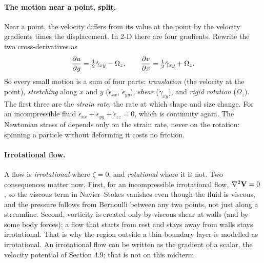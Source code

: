 \paragraph{The motion near a point, split.} Near a point, the velocity differs from its value at the point by the velocity gradients times the displacement. In 2-D there are four gradients. Rewrite the two cross-derivatives as
\[
\frac{\partial u}{\partial y} = \tfrac12\dot\gamma_{xy} - \Omega_z, \qquad \frac{\partial v}{\partial x} = \tfrac12\dot\gamma_{xy} + \Omega_z .
\]
So every small motion is a sum of four parts: \emph{translation} (the velocity at the point), \emph{stretching} along $x$ and $y$ ($\dot\epsilon_{xx}$, $\dot\epsilon_{yy}$), \emph{shear} ($\dot\gamma_{xy}$), and \emph{rigid rotation} ($\Omega_z$). The first three are the \emph{strain rate}, the rate at which shape and size change. For an incompressible fluid $\dot\epsilon_{xx} + \dot\epsilon_{yy} + \dot\epsilon_{zz} = 0$, which is continuity again. The Newtonian stress of  depends only on the strain rate, never on the rotation: spinning a particle without deforming it costs no friction.

\paragraph{Irrotational flow.} A flow is \emph{irrotational} where $\zeta = 0$, and \emph{rotational} where it is not. Two consequences matter now. First, for an incompressible irrotational flow, $\nabla^2\mathbf{V} = 0$, so the viscous term in Navier--Stokes vanishes even though the fluid is viscous, and the pressure follows from Bernoulli between any two points, not just along a streamline. Second, vorticity is created only by viscous shear at walls (and by some body forces); a flow that starts from rest and stays away from walls stays irrotational. That is why the region outside a thin boundary layer is modelled as irrotational. An irrotational flow can be written as the gradient of a scalar, the velocity potential of Section 4.9; that is not on this midterm.

